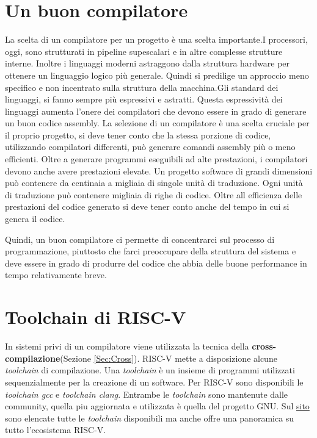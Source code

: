 \documentclass[12pt,a4paper]{report}
\begin{document}
\section{Un buon compilatore} %
La scelta di un compilatore per un progetto è una scelta importante.I processori, oggi, sono strutturati in pipeline supescalari e in altre complesse strutture interne. Inoltre i linguaggi moderni astraggono dalla struttura hardware per ottenere un linguaggio logico più generale. Quindi si predilige un approccio meno specifico e non incentrato sulla struttura della macchina.Gli standard dei linguaggi, si fanno  sempre più espressivi e astratti.  Questa espressività dei linguaggi aumenta l'onere dei compilatori che devono essere in grado di generare un buon codice assembly. La selezione di un compilatore è una scelta cruciale per il proprio progetto, si deve tener conto che la stessa porzione di codice, utilizzando compilatori differenti, può generare comandi assembly più o meno efficienti.
Oltre a generare programmi eseguibili ad alte prestazioni, i compilatori devono anche avere prestazioni elevate. Un progetto software di grandi dimensioni  può contenere da centinaia a migliaia di singole unità di traduzione. Ogni unità di traduzione può contenere migliaia di righe di codice.  Oltre all efficienza delle prestazioni del codice generato si deve tener conto anche del tempo in cui si genera il codice.

Quindi, un buon compilatore ci permette di concentrarci sul processo di programmazione,  piuttosto che farci preoccupare della struttura del sistema e deve essere in grado di produrre del codice che abbia delle buone performance in tempo relativamente breve.


\section{Toolchain di RISC-V}
In sistemi privi di un compilatore viene utilizzata la tecnica della \textbf{cross-compilazione}(Sezione \ref{Sec:Cross}).  RISC-V mette a disposizione alcune \textit{toolchain} di compilazione. Una \textit{toolchain} è un insieme di programmi utilizzati sequenzialmente per la creazione di un software. Per RISC-V sono disponibili le \textit{toolchain gcc}\cite{toolchain_gcc} e \textit{toolchain clang}\cite{toolchain_clang}. Entrambe le \textit{toolchain} sono mantenute dalle community, quella piu aggiornata e utilizzata è quella del progetto GNU.  Sul \href{https://wiki.riscv.org/display/HOME/RISC-V+Software+Ecosystem}{sito} sono elencate tutte le \textit{toolchain} disponibili ma anche offre una panoramica su tutto l'ecosistema RISC-V.
\end{document}
